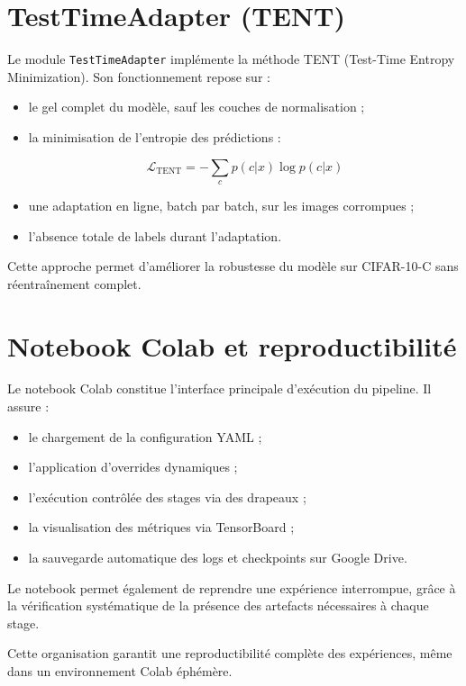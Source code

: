 \documentclass[12pt,a4paper]{report}
\begin{document}
	\section{TestTimeAdapter (TENT)}
	
	Le module \texttt{TestTimeAdapter} implémente la méthode TENT (Test-Time Entropy Minimization). Son fonctionnement repose sur :
	
	\begin{itemize}
		\item le gel complet du modèle, sauf les couches de normalisation ;
		\item la minimisation de l’entropie des prédictions :
		
		
		\[
		\mathcal{L}_{\text{TENT}} = - \sum_{c} p(c|x) \log p(c|x)
		\]
		
		
		\item une adaptation en ligne, batch par batch, sur les images corrompues ;
		\item l’absence totale de labels durant l’adaptation.
	\end{itemize}
	
	Cette approche permet d’améliorer la robustesse du modèle sur CIFAR-10-C sans réentraînement complet.
	
	\section{Notebook Colab et reproductibilité}
	
	Le notebook Colab constitue l’interface principale d’exécution du pipeline. Il assure :
	
	\begin{itemize}
		\item le chargement de la configuration YAML ;
		\item l’application d’overrides dynamiques ;
		\item l’exécution contrôlée des stages via des drapeaux ;
		\item la visualisation des métriques via TensorBoard ;
		\item la sauvegarde automatique des logs et checkpoints sur Google Drive.
	\end{itemize}
	
	Le notebook permet également de reprendre une expérience interrompue, grâce à la vérification systématique de la présence des artefacts nécessaires à chaque stage.
	
	Cette organisation garantit une reproductibilité complète des expériences, même dans un environnement Colab éphémère.
	
\end{document}
